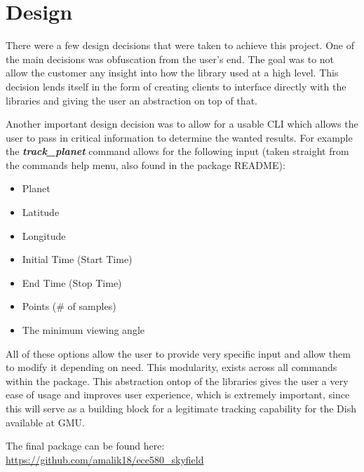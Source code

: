 \documentclass[../main.tex]{subfiles}
\begin{document}
\section{Design}
There were a few design decisions that were taken to achieve this project. One of the main decisions was obfuscation from the user's end. The goal was to not allow the customer any insight into how the library used at a high level. This decision lends itself in the form of creating clients to interface directly with the libraries and giving the user an abstraction on top of that. 

Another important design decision was to allow for a usable CLI which allows the user to pass in critical information to determine the wanted results. For example the \textbf{\textit{track\_planet}} command allows for the following input (taken straight from the commands help menu, also found in the package README): 

\begin{itemize}
    \item Planet
    \item Latitude
    \item Longitude
    \item Initial Time (Start Time)
    \item End Time (Stop Time)
    \item Points (\# of samples)
    \item The minimum viewing angle
\end{itemize}

All of these options allow the user to provide very specific input and allow them to modify it depending on need. This modularity, exists across all commands within the package. This abstraction ontop of the libraries gives the user a very ease of usage and improves user experience, which is extremely important, since this will serve as a building block for a legitimate tracking capability for the Dish available at GMU. 

The final package can be found here: \url{https://github.com/amalik18/ece580_skyfield}
\end{document}
